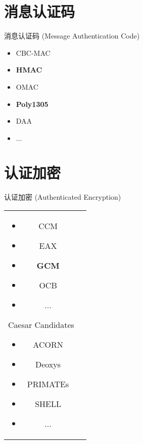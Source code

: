 \documentclass[xcolor=svgnames,handout]{beamer}
\begin{document}
\section{消息认证码}
\begin{frame}
	{消息认证码 (Message Authentication Code)}
	\begin{itemize}
		\item CBC-MAC
		\item \begin{alertenv}\textbf{HMAC}\end{alertenv}
		\item OMAC
		\item \begin{alertenv}\textbf{Poly1305}\end{alertenv}
		\item DAA
		\item ...
	\end{itemize}
\end{frame}

\section{认证加密}
\begin{frame}
	{认证加密 (Authenticated Encryption)}
    \begin{table}
    	\begin{tabular}{cc}
    		\begin{minipage}{.5\linewidth}
				\begin{itemize}
					\item CCM
					\item EAX
					\item \begin{alertenv}\textbf{GCM}\end{alertenv}
					\item OCB
					\item ...
				\end{itemize}
			\end{minipage}
			\begin{minipage}{.5\linewidth}
				Caesar Candidates
			    \begin{itemize}
					\item ACORN
					\item Deoxys
					\item PRIMATEs
					\item SHELL
					\item ...
				\end{itemize}
			\end{minipage}
		\end{tabular}
	\end{table}
\end{frame}
\end{document}

